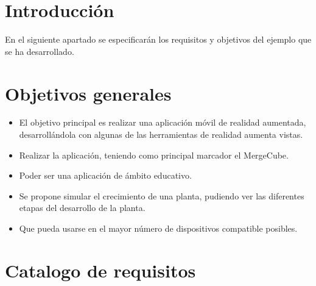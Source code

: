 
\section{Introducción}
En el siguiente apartado se especificarán los requisitos y objetivos del ejemplo que se ha desarrollado.
\section{Objetivos generales}
 \begin{itemize}
	\item El objetivo principal es realizar una aplicación móvil de realidad aumentada, desarrollándola con algunas de las herramientas de realidad aumenta vistas.
	\item Realizar la aplicación, teniendo como principal marcador el MergeCube.
	\item Poder ser una aplicación de ámbito educativo.
	\item Se propone simular el crecimiento de una planta, pudiendo ver las diferentes etapas del desarrollo de la planta.
	\item Que pueda usarse en el mayor número de dispositivos compatible posibles.  
\end{itemize}
\section{Catalogo de requisitos}
